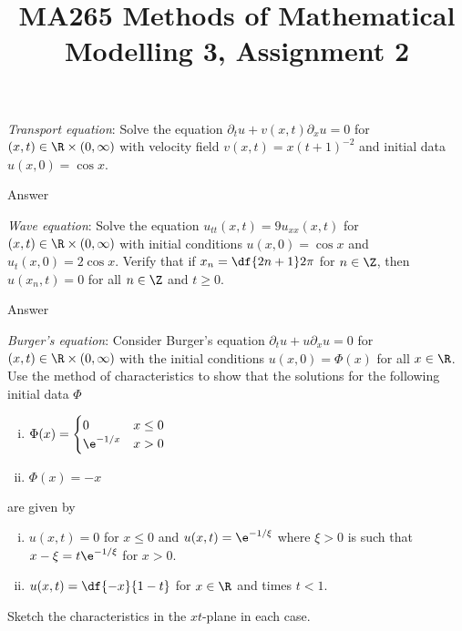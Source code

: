 \documentclass[a4paper]{article}
\title{MA265 Methods of Mathematical Modelling 3, Assignment 2}
\begin{document}
\maketitle

\setlength{\parindent}{0em}
\setlength{\parskip}{1em}


\begin{questionbody}
\textit{Transport equation}: Solve the equation $\partial_t u + v(x, t) \partial_x u = 0$ for $(x, t) \in \R \times (0, \infty)$ with velocity field $v(x, t) = x {(t + 1)}^{-2}$ and initial data $u(x, 0) = \cos x$.
\end{questionbody}

Answer



\begin{questionbody}
\textit{Wave equation}: Solve the equation $u_{tt}(x, t) = 9 u_{xx}(x, t)$ for $(x, t) \in \R \times (0, \infty)$ with initial conditions $u(x, 0) = \cos x$ and $u_t(x, 0) = 2 \cos x$. Verify that if $x_n = \df{2n+1}2 \pi$ for $n \in \Z$, then $u(x_n, t) = 0$ for all $n \in \Z$ and $t \ge 0$.
\end{questionbody}

Answer



\begin{questionbody}
\textit{Burger's equation}: Consider Burger's equation $\partial_t u + u \partial_x u = 0$ for $(x, t) \in \R \times (0, \infty)$ with the initial conditions $u(x, 0) = \Phi(x)$ for all $x \in \R$. Use the method of characteristics to show that the solutions for the following initial data $\Phi$
\begin{enumerate}[(i)]
\item $\Phi(x) = \begin{cases}
    0 & x \le 0 \\
    \e^{-1 / x} & x > 0
\end{cases}$
\item $\Phi(x) = -x$
\end{enumerate}
are given by
\begin{enumerate}[(i)]
\item $u(x, t) = 0$ for $x \le 0$ and $u(x, t) = \e^{-1 / \xi}$ where $\xi > 0$ is such that $x - \xi = t \e^{-1 / \xi}$ for $x > 0$.
\item $u(x, t) = \df{-x}{1 - t}$ for $x \in \R$ and times $t < 1$.
\end{enumerate}
Sketch the characteristics in the $xt$-plane in each case.
\end{questionbody}
\end{document}
